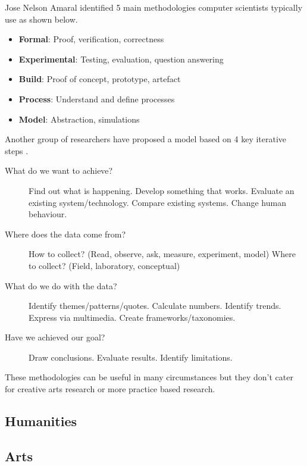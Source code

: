 Jose Nelson Amaral identified 5 main methodologies computer scientists typically use \autocite{Amaral} as shown below.

\begin{itemize}
  \item \textbf{Formal}: Proof, verification, correctness
  \item \textbf{Experimental}: Testing, evaluation, question answering
  \item \textbf{Build}: Proof of concept, prototype, artefact
  \item \textbf{Process}: Understand and define processes
  \item \textbf{Model}: Abstraction, simulations
\end{itemize}

Another group of researchers have proposed a model based on 4 key iterative steps \autocite{Holz2006}.

\begin{description}
  \item [What do we want to achieve?] Find out what is happening. Develop something that works. Evaluate an existing system/technology. Compare existing systems. Change human behaviour.
  \item [Where does the data come from?] How to collect? (Read, observe, ask, measure, experiment, model) Where to collect? (Field, laboratory, conceptual)
  \item [What do we do with the data?] Identify themes/patterns/quotes. Calculate numbers. Identify trends. Express via multimedia. Create frameworks/taxonomies.
  \item [Have we achieved our goal?] Draw conclusions. Evaluate results. Identify limitations.
\end{description}

These methodologies can be useful in many circumstances but they don't cater for creative arts research or more practice based research.


\subsection{Humanities}



\subsection{Arts}



